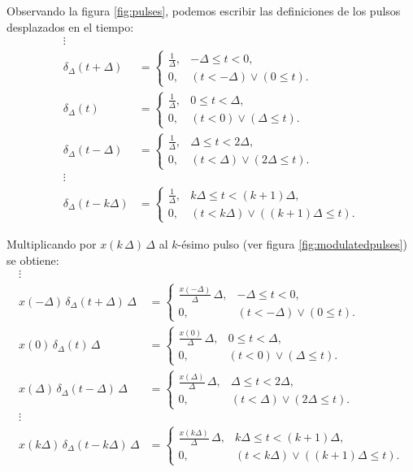 \documentclass[11pt,a4paper,openany]{book}
\begin{document}
Observando la figura \ref{fig:pulses}, podemos escribir las definiciones de los pulsos desplazados en el tiempo:
\begin{align}
	\vdots \nonumber \\ 
	\delta_{\Delta}(t+\Delta) &= \begin{cases}
		\frac{1}{\Delta}, & -\Delta \leq t < 0, \\ 
		0, & (t < -\Delta) \lor (0 \leq t).
	\end{cases} \\ 
	\delta_{\Delta}(t) &= \begin{cases}
		\frac{1}{\Delta}, & 0 \leq t < \Delta, \\ 
		0, & (t < 0) \lor (\Delta \leq t).
	\end{cases} \\ 
	\delta_{\Delta}(t-\Delta) &= \begin{cases}
		\frac{1}{\Delta}, & \Delta \leq t < 2\Delta, \\ 
		0, & (t < \Delta) \lor (2\Delta \leq t).
	\end{cases} \\ 
	\vdots \nonumber \\ 
	\delta_{\Delta}(t-k\Delta) &= \begin{cases}
		\frac{1}{\Delta}, & k\Delta \leq t < (k+1)\Delta, \\ 
		0, & (t < k\Delta) \lor ((k+1)\Delta \leq t).
	\end{cases}
\end{align}

Multiplicando por $x(k \, \Delta) \, \Delta$ al $k$-ésimo pulso (ver figura \ref{fig:modulatedpulses}) se obtiene:
\begin{align}
	\vdots \nonumber \\ 
	x(-\Delta) \, \delta_{\Delta}(t+\Delta) \, \Delta &= \begin{cases}
		\frac{x(-\Delta)}{\Delta} \, \Delta, & -\Delta \leq t < 0, \\ 
		0, & (t < -\Delta) \lor (0 \leq t).
	\end{cases} \\ 
	x(0) \, \delta_{\Delta}(t) \, \Delta &= \begin{cases}
		\frac{x(0)}{\Delta} \, \Delta, & 0 \leq t < \Delta, \\ 
		0, & (t < 0) \lor (\Delta \leq t).
	\end{cases} \\ 
	x(\Delta) \, \delta_{\Delta}(t-\Delta) \, \Delta &= \begin{cases}
		\frac{x(\Delta)}{\Delta} \, \Delta, & \Delta \leq t < 2\Delta, \\ 
		0, & (t < \Delta) \lor (2\Delta \leq t).
	\end{cases} \\ 
	\vdots \nonumber \\ 
	x(k\Delta) \, \delta_{\Delta}(t-k\Delta) \, \Delta &= \begin{cases}
		\frac{x(k\Delta)}{\Delta} \, \Delta, & k\Delta \leq t < (k+1)\Delta, \\ 
		0, & (t < k\Delta) \lor ((k+1)\Delta \leq t).
	\end{cases}
\end{align}
\end{document}
